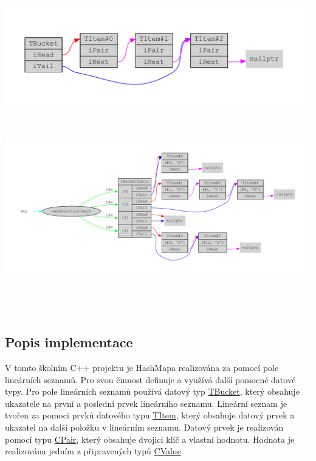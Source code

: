 \begin{DoxyImage}
\includegraphics[width=\textwidth,height=\textheight/2,keepaspectratio=true]{dot_CHashMapPrimitive}
\end{DoxyImage}
~\newline
 
\begin{DoxyImage}
\includegraphics[width=\textwidth,height=\textheight/2,keepaspectratio=true]{dot_CHashMap}
\end{DoxyImage}
~\newline


~\newline


\subsection*{Popis implementace}

V tomto školním C++ projektu je Hash\+Mapa realizována za pomocí pole lineárních seznamů. Pro svou činnost definuje a využívá další pomocné datové typy. Pro pole lineárních seznamů používá datový typ \hyperlink{struct_c_hash_map_1_1_t_bucket}{T\+Bucket}, který obsahuje ukazatele na první a poslední prvek lineárního seznamu. Lineární seznam je tvořen za pomoci prvků datového typu \hyperlink{struct_c_hash_map_1_1_t_item}{T\+Item}, který obsahuje datový prvek a ukazatel na další položku v lineárním seznamu. Datový prvek je realizován pomocí typu \hyperlink{class_c_pair}{C\+Pair}, který obsahuje dvojici klíč a vlastní hodnotu. Hodnota je realizována jedním z připravených typů \hyperlink{class_c_value__bool_1_1_c_value}{C\+Value}.

